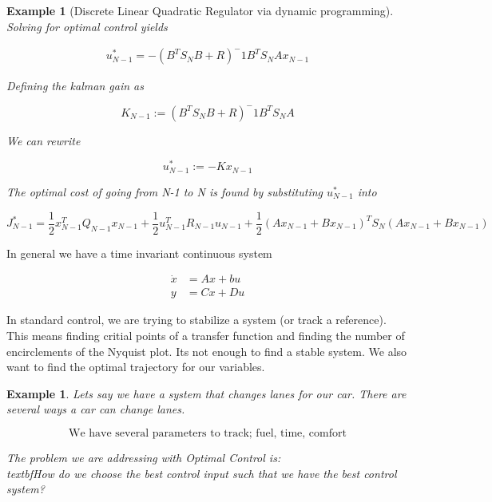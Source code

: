 \documentclass[11pt, a4paper]{article} %
\newtheorem{example}[theorem]{Example}
\begin{document}
\begin{example}[Discrete Linear Quadratic Regulator via dynamic programming]
    Solving for optimal control yields

    \begin{align*}
        u_{N-1}^* = - \left( B^T S_N B + R \right) ^-1 B^T S_N Ax_{N-1}
    \end{align*}


    Defining the kalman gain as
        
    \[
        K_{N-1} := \left( B^T S_N B + R \right) ^-1 B^T S_N A
    \]

    We can rewrite

    \[
        u_{N-1}^* := -K x_{N-1}
    \]
    
    The optimal cost of going from N-1 to N is found by substituting $ u_{N-1}^* $ into 

    \[
        J_{N-1}^* = \frac{ 1 }{ 2 } x_{N-1}^T Q_{N-1} x_{N-1} + \frac{ 1 }{ 2 } u_{N-1}^T R_{N-1} u_{N-1} + \frac{ 1 }{ 2 } \left( Ax_{N-1} + Bx_{N-1} \right) ^T S_N \left( Ax_{N-1} + Bx_{N-1} \right)
    \]
    
    
    
    
\end{example}




In general we have a time invariant continuous system 

\begin{align*}
    \dot{x} &= Ax+bu \\
    y &= Cx+Du
\end{align*}
    

In standard control, we are trying to stabilize a system (or track a reference).  This means finding critial points of a transfer function and finding the number of encirclements of the Nyquist plot. Its not enough to find a stable system. We also want to find the optimal trajectory for our variables. \\

\begin{example}
    Lets say we have a system that changes lanes for our car. There are several ways a car can change lanes. 
    
    \[
        \text{We have several parameters to track; fuel, time, comfort}    
    \]
    
    The problem we are addressing with Optimal Control is: \\textbf{\textit{How do we choose the best control input such that we have the best control system?}}


\end{example}
\end{document}
